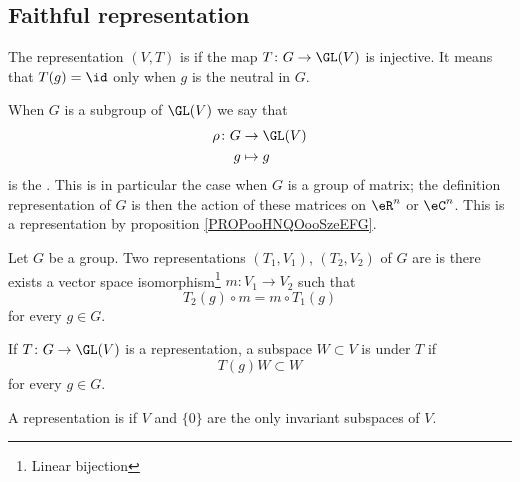 \subsection{Faithful representation}

\begin{definition}      \label{DEFooAFSAooGDSDBb}
	The representation \( (V,T)\) is  if the map \( T\colon G\to \GL(V)\) is injective. It means that \( T(g)=\id\) only when \( g\) is the neutral in \( G\).
\end{definition}

When \( G\) is a subgroup of \( \GL(V)\) we say that
\begin{equation}
	\begin{aligned}
		\rho\colon G & \to \GL(V) \\
		g            & \mapsto g
	\end{aligned}
\end{equation}
is the . This is in particular the case when \( G\) is a group of matrix; the definition representation of \( G\) is then the action of these matrices on \( \eR^n\) or \( \eC^n\). This is a representation by proposition \ref{PROPooHNQOooSzeEFG}.

\begin{definition}
	Let \( G\) be a group. Two representations \( (T_1,V_1)\), \( (T_2,V_2)\) of \( G\) are  is there exists a vector space isomorphism\footnote{Linear bijection} \( m\colon V_1\to V_2\) such that
	\begin{equation}
		T_2(g)\circ m=m\circ T_1(g)
	\end{equation}
	for every \( g\in G\).
\end{definition}

\begin{definition}
	If \( T\colon G\to \GL(V)\) is a representation, a subspace \( W\subset V\) is  under \( T\) if
	\begin{equation}
		T(g)W\subset W
	\end{equation}
	for every \( g\in G\).

	A representation is  if \( V\) and \( \{ 0 \}\) are the only invariant subspaces of \( V\).
\end{definition}

